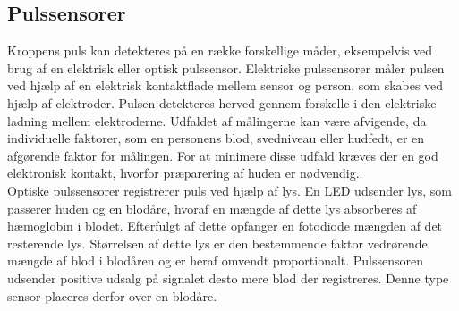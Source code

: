 \subsection{Pulssensorer}\label{sec:pulssensor}
Kroppens puls kan detekteres på en række forskellige måder, eksempelvis ved brug af en elektrisk eller optisk pulssensor. Elektriske pulssensorer måler pulsen ved hjælp af en elektrisk kontaktflade mellem sensor og person, som skabes ved hjælp af elektroder. Pulsen detekteres herved gennem forskelle i den elektriske ladning mellem elektroderne. Udfaldet af målingerne kan være afvigende, da individuelle faktorer, som en personens blod, svedniveau eller hudfedt, er en afgørende faktor for målingen. For at minimere disse udfald kræves der en god elektronisk kontakt, hvorfor præparering af huden er nødvendig..~\citep{PhuaLissorguesMercier2009}  \\
Optiske pulssensorer registrerer puls ved hjælp af lys. En LED udsender lys, som passerer huden og en blodåre, hvoraf en mængde af dette lys absorberes af hæmoglobin i blodet. Efterfulgt af dette opfanger en fotodiode mængden af det resterende lys. Størrelsen af dette lys er den bestemmende faktor vedrørende mængde af blod i blodåren og er heraf omvendt proportionalt. Pulssensoren udsender positive udsalg på signalet desto mere blod der registreres. Denne type sensor placeres derfor over en blodåre.~\citep{PhuaLissorguesMercier2009,SrinivasReddySrinivas2006} 

